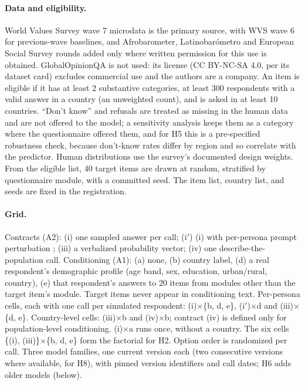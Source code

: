 \documentclass[11pt]{article}
\begin{document}
\paragraph{Data and eligibility.} World Values Survey wave 7 microdata is the primary source, with WVS wave 6 for previous-wave baselines, and Afrobarometer, Latinobar\'ometro and European Social Survey rounds added only where written permission for this use is obtained. GlobalOpinionQA is not used: its license (CC BY-NC-SA 4.0, per its dataset card) excludes commercial use and the authors are a company. An item is eligible if it has at least 2 substantive categories, at least 300 respondents with a valid answer in a country (an unweighted count), and is asked in at least 10 countries. ``Don't know'' and refusals are treated as missing in the human data and are not offered to the model; a sensitivity analysis keeps them as a category where the questionnaire offered them, and for H5 this is a pre-specified robustness check, because don't-know rates differ by region and so correlate with the predictor. Human distributions use the survey's documented design weights. From the eligible list, 40 target items are drawn at random, stratified by questionnaire module, with a committed seed. The item list, country list, and seeds are fixed in the registration.

\paragraph{Grid.} Contracts (A2): (i) one sampled answer per call; (i$'$) (i) with per-persona prompt perturbation \citep{jang2026}; (iii) a verbalized probability vector; (iv) one describe-the-population call. Conditioning (A1): (a) none, (b) country label, (d) a real respondent's demographic profile (age band, sex, education, urban/rural, country), (e) that respondent's answers to 20 items from modules other than the target item's module. Target items never appear in conditioning text. Per-persona cells, each with one call per simulated respondent: (i)$\times$\{b, d, e\}, (i$'$)$\times$d and (iii)$\times$\{d, e\}. Country-level cells: (iii)$\times$b and (iv)$\times$b; contract (iv) is defined only for population-level conditioning. (i)$\times$a runs once, without a country. The six cells \{(i), (iii)\}$\times$\{b, d, e\} form the factorial for H2. Option order is randomized per call. Three model families, one current version each (two consecutive versions where available, for H8), with pinned version identifiers and call dates; H6 adds older models (below).
\end{document}
